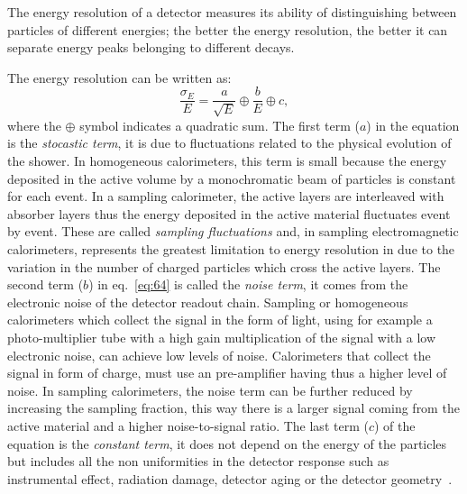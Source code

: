 The energy resolution of a detector measures its ability of distinguishing
between particles of different energies; the better the energy resolution, the
better it can separate energy peaks belonging to different decays.

The energy resolution can be written as:
\begin{equation}
  \label{eq:64}
  \frac{\sigma_E}{E} = \frac{a}{\sqrt{E}} \oplus \frac{b}{E} \oplus c,
\end{equation}
where the $\oplus$ symbol indicates a quadratic sum. The first term ($a$) in the
equation is the \emph{stocastic term}, it is due to fluctuations related to the
physical evolution of the shower. In homogeneous calorimeters, this term is
small because the energy deposited in the active volume by a monochromatic beam
of particles is constant for each event. In a sampling calorimeter, the active
layers are interleaved with absorber layers thus the energy deposited in the
active material fluctuates event by event. These are called \emph{sampling
  fluctuations} and, in sampling electromagnetic calorimeters, represents the
greatest limitation to energy resolution in due to the variation in the number
of charged particles which cross the active layers. The second term ($b$) in
eq.~\eqref{eq:64} is called the \emph{noise term}, it comes from the electronic
noise of the detector readout chain. Sampling or homogeneous calorimeters which
collect the signal in the form of light, using for example a photo-multiplier
tube with a high gain multiplication of the signal with a low electronic noise,
can achieve low levels of noise. Calorimeters that collect the signal in form of
charge, must use an pre-amplifier having thus a higher level of noise. In
sampling calorimeters, the noise term can be further reduced by increasing the
sampling fraction, this way there is a larger signal coming from the active
material and a higher noise-to-signal ratio. The last term ($c$) of the equation
is the \emph{constant term}, it does not depend on the energy of the particles
but includes all the non uniformities in the detector response such as
instrumental effect, radiation damage, detector aging or the detector
geometry~\cite{Calorimetry}.
